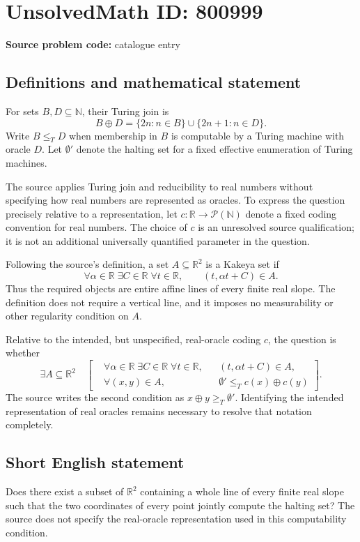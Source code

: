 \documentclass[11pt]{article}
\newcommand{\N}{\mathbb{N}}
\newcommand{\R}{\mathbb{R}}
\begin{document}
\section*{UnsolvedMath ID: 800999}
\textbf{Source problem code:} catalogue entry
\subsection{Definitions and mathematical statement}
For sets \(B,D\subseteq\N\), their Turing join is
\[
B\oplus D=\{2n:n\in B\}\cup\{2n+1:n\in D\}.
\]
Write \(B\leq_T D\) when membership in \(B\) is computable by a Turing machine with oracle \(D\). Let \(\emptyset'\) denote the halting set for a fixed effective enumeration of Turing machines.

The source applies Turing join and reducibility to real numbers without specifying how real numbers are represented as oracles. To express the question precisely relative to a representation, let \(c:\R\to\mathcal P(\N)\) denote a fixed coding convention for real numbers. The choice of \(c\) is an unresolved source qualification; it is not an additional universally quantified parameter in the question.

Following the source's definition, a set \(A\subseteq\R^2\) is a Kakeya set if
\[
\forall\alpha\in\R\;\exists C\in\R\;\forall t\in\R,
\qquad (t,\alpha t+C)\in A.
\]
Thus the required objects are entire affine lines of every finite real slope. The definition does not require a vertical line, and it imposes no measurability or other regularity condition on \(A\).

Relative to the intended, but unspecified, real-oracle coding \(c\), the question is whether
\[
\exists A\subseteq\R^2\quad
\left[
\begin{aligned}
&\forall\alpha\in\R\;\exists C\in\R\;\forall t\in\R,
&& (t,\alpha t+C)\in A,\\
&\forall(x,y)\in A,
&& \emptyset'\leq_T c(x)\oplus c(y)
\end{aligned}
\right].
\]
The source writes the second condition as \(x\oplus y\geq_T\emptyset'\). Identifying the intended representation of real oracles remains necessary to resolve that notation completely.
\subsection{Short English statement}
Does there exist a subset of \(\R^2\) containing a whole line of every finite real slope such that the two coordinates of every point jointly compute the halting set? The source does not specify the real-oracle representation used in this computability condition.
\end{document}
